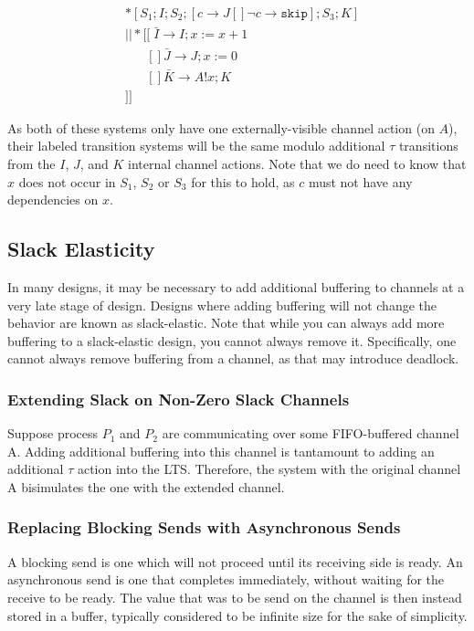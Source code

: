 \documentclass[times, 10pt]{article}
\begin{document}
\begin{align*}
& *[S_1; I; S_2; [ c \rightarrow J [] \lnot c \rightarrow \texttt{skip} ]; S_3; K] \\
& || *[[\;\bar{I} \rightarrow I; x := x + 1 \\
&\;\;\;\;\;\;[] \bar{J} \rightarrow J; x := 0 \\
&\;\;\;\;\;\;[] \bar{K} \rightarrow  A!x; K \\
&]]
\end{align*}

As both of these systems only have one externally-visible channel action (on $A$), their labeled transition systems will be the same modulo additional $\tau$ transitions from the $I$, $J$, and $K$ internal channel actions. Note that we do need to know that $x$ does not occur in $S_1$, $S_2$ or $S_3$ for this to hold, as $c$ must not have any dependencies on $x$.

\subsection{Slack Elasticity}

In many designs, it may be necessary to add additional buffering to channels at a very late stage of design. Designs where adding buffering will not change the behavior are known as slack-elastic. Note that while you can always add more buffering to a slack-elastic design, you cannot always remove it. Specifically, one cannot always remove buffering from a channel, as that may introduce deadlock.

\subsubsection{Extending Slack on Non-Zero Slack Channels}

Suppose process $P_1$ and $P_2$ are communicating over some FIFO-buffered channel A.  Adding additional buffering into this channel is tantamount to adding an additional $\tau$ action into the LTS.  Therefore, the system with the original channel A bisimulates the one with the extended channel. 

\subsubsection{Replacing Blocking Sends with Asynchronous Sends}

A blocking send is one which will not proceed until its receiving side is ready. An asynchronous send is one that completes immediately, without waiting for the receive to be ready. The value that was to be send on the channel is then instead stored in a buffer, typically considered to be infinite size for the sake of simplicity.
\end{document}

